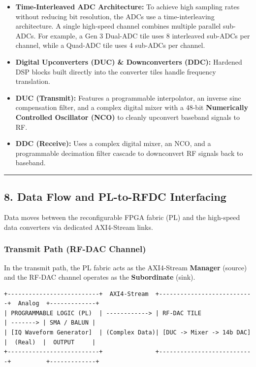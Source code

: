 \documentclass[
]{article}
\providecommand{\tightlist}{%
  \setlength{\itemsep}{0pt}\setlength{\parskip}{0pt}}
\begin{document}
\begin{itemize}
\tightlist
\item
  \textbf{Time-Interleaved ADC Architecture:} To achieve high sampling
  rates without reducing bit resolution, the ADCs use a
  time-interleaving architecture. A single high-speed channel combines
  multiple parallel sub-ADCs. For example, a Gen 3 Dual-ADC tile uses 8
  interleaved sub-ADCs per channel, while a Quad-ADC tile uses 4
  sub-ADCs per channel.
\item
  \textbf{Digital Upconverters (DUC) \& Downconverters (DDC):} Hardened
  DSP blocks built directly into the converter tiles handle frequency
  translation.
\item
  \textbf{DUC (Transmit):} Features a programmable interpolator, an
  inverse sinc compensation filter, and a complex digital mixer with a
  48-bit \textbf{Numerically Controlled Oscillator (NCO)} to cleanly
  upconvert baseband signals to RF.
\item
  \textbf{DDC (Receive):} Uses a complex digital mixer, an NCO, and a
  programmable decimation filter cascade to downconvert RF signals back
  to baseband.
\end{itemize}

\begin{center}\rule{0.5\linewidth}{0.5pt}\end{center}

\subsection{8. Data Flow and PL-to-RFDC
Interfacing}\label{data-flow-and-pl-to-rfdc-interfacing}

Data moves between the reconfigurable FPGA fabric (PL) and the
high-speed data converters via dedicated AXI4-Stream links.

\subsubsection{Transmit Path (RF-DAC
Channel)}\label{transmit-path-rf-dac-channel}

In the transmit path, the PL fabric acts as the AXI4-Stream
\textbf{Manager} (source) and the RF-DAC channel operates as the
\textbf{Subordinate} (sink).

\begin{verbatim}
+--------------------------+  AXI4-Stream  +---------------------------+  Analog  +-------------+
| PROGRAMMABLE LOGIC (PL)  | ------------> | RF-DAC TILE               | -------> | SMA / BALUN |
| [IQ Waveform Generator]  | (Complex Data)| [DUC -> Mixer -> 14b DAC] |  (Real)  |  OUTPUT     |
+--------------------------+               +---------------------------+          +-------------+
\end{verbatim}
\end{document}
